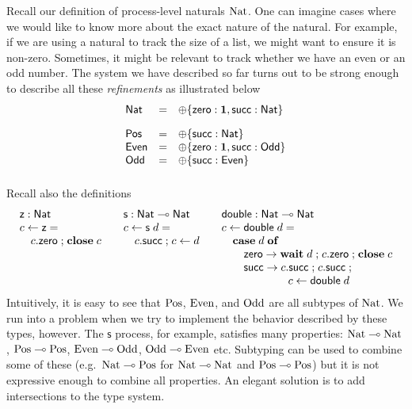 \documentclass[submission,copyright,creativecommons]{eptcs}
\newcommand{\m}[1]{\mathsf{#1}}
\newcommand{\mb}[1]{\mbox{\bf #1}}
\newcommand{\semi}{\mathrel{;}}
\begin{document}
Recall our definition of process-level naturals $\nat$. One can imagine cases where we would like to know more about the exact nature of the natural. For example, if we are using a natural to track the size of a list, we might want to ensure it is non-zero. Sometimes, it might be relevant to track whether we have an even or an odd number. The system we have described so far turns out to be strong enough to describe all these \emph{refinements} as illustrated below
\[
\begin{array}{lcll}
  \m{Nat} & = & \internal\{\m{zero} : \terminate, \m{succ} : \m{Nat}\} \\[1em]
  \m{Pos} & = & \internal\{\m{succ} : \m{Nat}\} \\
  \m{Even} & = & \internal\{\m{zero} : \terminate, \m{succ} : \m{Odd}\} \\
  \m{Odd} & = & \internal\{\m{succ} : \m{Even}\} \\[1em]
\end{array}
\]
Recall also the definitions
\[
\begin{array}{l@{\hspace{2em}}l@{\hspace{2em}}l}
  \m{z} : \m{Nat} & \m{s} : \m{Nat} \lolli \m{Nat} & \m{double} : \m{Nat} \lolli \m{Nat} \\
  c \leftarrow \m{z} = & c \leftarrow \m{s}\; d = & c \leftarrow \m{double}\; d = \\
  \quad c.\m{zero} \semi \mb{close}\; c & \quad c.\m{succ} \semi c \leftarrow d & \quad \mb{case}\; d\; \mb{of} \\
& & \quad\quad \m{zero} \rightarrow \mb{wait}\; d \semi c.\m{zero} \semi \mb{close}\; c \\
& & \quad\quad \m{succ} \rightarrow c.\m{succ} \semi c.\m{succ} \semi \\
& & \hspace{6em} c \leftarrow \m{double}\; d
\end{array}
\]
Intuitively, it is easy to see that $\pos$, $\even$, and $\odd$ are all subtypes of $\nat$. We run into a problem when we try to implement the behavior described by these types, however. The $\m{s}$ process, for example, satisfies many properties: $\nat \lolli \nat$, $\pos \lolli \pos$, $\even \lolli \odd$, $\odd \lolli \even$ etc. Subtyping can be used to combine some of these (e.g.\ $\nat \lolli \pos$ for $\nat \lolli \nat$ and $\pos \lolli \pos$) but it is not expressive enough to combine all properties. An elegant solution is to add intersections to the type system.
\end{document}
